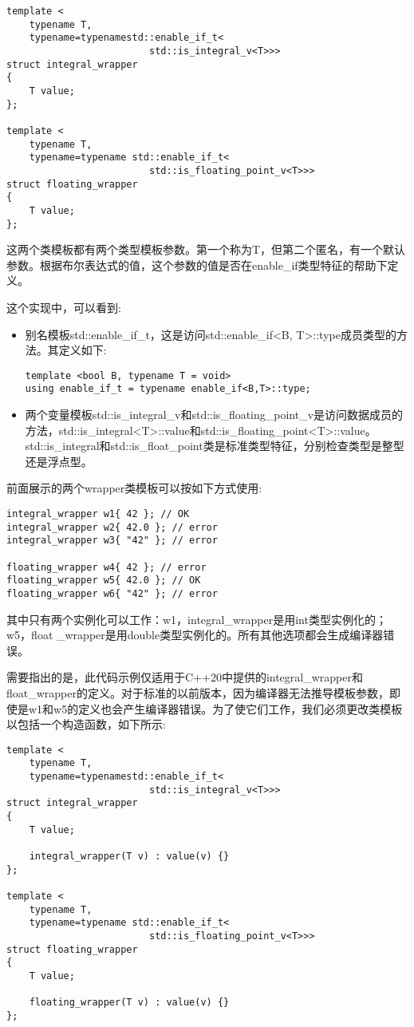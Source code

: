 \begin{lstlisting}[style=styleCXX]
template <
	typename T,
	typename=typenamestd::enable_if_t<
						 std::is_integral_v<T>>>
struct integral_wrapper
{
	T value;
};

template <
	typename T,
	typename=typename std::enable_if_t<
						 std::is_floating_point_v<T>>>
struct floating_wrapper
{
	T value;
};
\end{lstlisting}

这两个类模板都有两个类型模板参数。第一个称为T，但第二个匿名，有一个默认参数。根据布尔表达式的值，这个参数的值是否在enable\_if类型特征的帮助下定义。

这个实现中，可以看到:

\begin{itemize}
\item
别名模板std::enable\_if\_t，这是访问std::enable\_if<B, T>::type成员类型的方法。其定义如下:

\begin{lstlisting}[style=styleCXX]
template <bool B, typename T = void>
using enable_if_t = typename enable_if<B,T>::type;
\end{lstlisting}

\item
两个变量模板std::is\_integral\_v和std::is\_floating\_point\_v是访问数据成员的方法，std::is\_integral<T>::value和std::is\_floating\_point<T>::value。std::is\_integral和std::is\_float\_point类是标准类型特征，分别检查类型是整型还是浮点型。
\end{itemize}

前面展示的两个wrapper类模板可以按如下方式使用:

\begin{lstlisting}[style=styleCXX]
integral_wrapper w1{ 42 }; // OK
integral_wrapper w2{ 42.0 }; // error
integral_wrapper w3{ "42" }; // error

floating_wrapper w4{ 42 }; // error
floating_wrapper w5{ 42.0 }; // OK
floating_wrapper w6{ "42" }; // error
\end{lstlisting}

其中只有两个实例化可以工作：w1，integral\_wrapper是用int类型实例化的；w5，float \_wrapper是用double类型实例化的。所有其他选项都会生成编译器错误。

需要指出的是，此代码示例仅适用于C++20中提供的integral\_wrapper和float\_wrapper的定义。对于标准的以前版本，因为编译器无法推导模板参数，即使是w1和w5的定义也会产生编译器错误。为了使它们工作，我们必须更改类模板以包括一个构造函数，如下所示:

\begin{lstlisting}[style=styleCXX]
template <
	typename T,
	typename=typenamestd::enable_if_t<
						 std::is_integral_v<T>>>
struct integral_wrapper
{
	T value;
	
	integral_wrapper(T v) : value(v) {}
};

template <
	typename T,
	typename=typename std::enable_if_t<
						 std::is_floating_point_v<T>>>
struct floating_wrapper
{
	T value;
	
	floating_wrapper(T v) : value(v) {}
};
\end{lstlisting}

